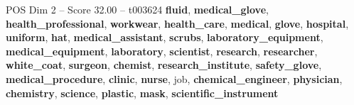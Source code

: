 \begin{textsample}{POS Dim 2 – Score 32.00 – t003624}  \label{ex:f2_pos_006}
\textbf{fluid}, \textbf{medical\_glove}, \textbf{health\_professional}, \textbf{workwear}, \textbf{health\_care}, \textbf{medical}, \textbf{glove}, \textbf{hospital}, \textbf{uniform}, \textbf{hat}, \textbf{medical\_assistant}, \textbf{scrubs}, \textbf{laboratory\_equipment}, \textbf{medical\_equipment}, \textbf{laboratory}, \textbf{scientist}, \textbf{research}, \textbf{researcher}, \textbf{white\_coat}, \textbf{surgeon}, \textbf{chemist}, \textbf{research\_institute}, \textbf{safety\_glove}, \textbf{medical\_procedure}, \textbf{clinic}, \textbf{nurse}, job, \textbf{chemical\_engineer}, \textbf{physician}, \textbf{chemistry}, \textbf{science}, \textbf{plastic}, \textbf{mask}, \textbf{scientific\_instrument}

\end{textsample}

